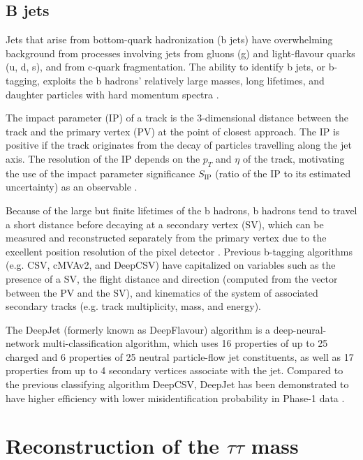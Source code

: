 \subsection{B jets}
Jets that arise from bottom-quark hadronization (b jets) have overwhelming background from processes involving jets from gluons (g) and light-flavour quarks (u, d, s), and from c-quark fragmentation. The ability to identify b jets, or b-tagging, exploits the b hadrons' relatively large masses, long lifetimes, and daughter particles with hard momentum spectra \cite{CMS-BTV-12-001}. 

The impact parameter (IP) of a track is the 3-dimensional distance between the track and the primary vertex (PV) at the point of closest approach. The IP is positive if the track originates from the decay of particles travelling along the jet axis. The resolution of the IP depends on the $p_{T}$ and $\eta$ of the track, motivating the use of the impact parameter significance $S_{\text{IP}}$ (ratio of the IP to its estimated uncertainty) as an observable \cite{CMS-BTV-12-001}.

Because of the large but finite lifetimes of the b hadrons, b hadrons tend to travel a short distance before decaying at a secondary vertex (SV), which can be measured and reconstructed separately from the primary vertex due to the excellent position resolution of the pixel detector \cite{CMS-BTV-12-001}. Previous b-tagging algorithms (e.g. CSV, cMVAv2, and DeepCSV) have capitalized on variables such as the presence of a SV, the flight distance and direction (computed from the vector between the PV and the SV), and kinematics of the system of associated secondary tracks (e.g. track multiplicity, mass, and energy). 

The DeepJet (formerly known as DeepFlavour) algorithm \cite{CMS-DP-2017-013} is a deep-neural-network multi-classification algorithm, which uses 16 properties of up to 25 charged and 6 properties of 25 neutral particle-flow jet constituents, as well as 17 properties from up to 4 secondary vertices associate with the jet. Compared to the previous classifying algorithm DeepCSV, DeepJet has been demonstrated to have higher efficiency with lower misidentification probability in Phase-1 data \cite{CMS-DP-2018-058}. 



\section{Reconstruction of the \texorpdfstring{$\tau\tau$}{tautau} mass}

